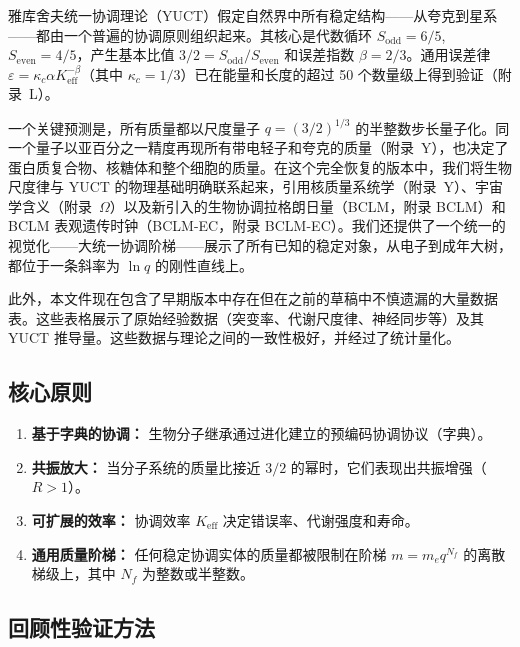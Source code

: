 \documentclass[11pt,a4paper]{article}
\begin{document}
	雅库舍夫统一协调理论（YUCT）假定自然界中所有稳定结构——从夸克到星系——都由一个普遍的协调原则组织起来。其核心是代数循环 \(S_{\mathrm{odd}} = 6/5\), \(S_{\mathrm{even}} = 4/5\)，产生基本比值 \(3/2 = S_{\mathrm{odd}}/S_{\mathrm{even}}\) 和误差指数 \(\beta = 2/3\)。通用误差律 \(\varepsilon = \kappa_c \alpha K_{\mathrm{eff}}^{-\beta}\)（其中 \(\kappa_c = 1/3\)）已在能量和长度的超过 50 个数量级上得到验证（附录~L）。
	
	一个关键预测是，所有质量都以尺度量子 \(q = (3/2)^{1/3}\) 的半整数步长量子化。同一个量子以亚百分之一精度再现所有带电轻子和夸克的质量（附录~Y），也决定了蛋白质复合物、核糖体和整个细胞的质量。在这个完全恢复的版本中，我们将生物尺度律与 YUCT 的物理基础明确联系起来，引用核质量系统学（附录~Y）、宇宙学含义（附录~\(\Omega\)）以及新引入的生物协调拉格朗日量（BCLM，附录 BCLM）和 BCLM 表观遗传时钟（BCLM-EC，附录 BCLM-EC）。我们还提供了一个统一的视觉化——大统一协调阶梯——展示了所有已知的稳定对象，从电子到成年大树，都位于一条斜率为 \(\ln q\) 的刚性直线上。
	
	此外，本文件现在包含了早期版本中存在但在之前的草稿中不慎遗漏的大量数据表。这些表格展示了原始经验数据（突变率、代谢尺度律、神经同步等）及其 YUCT 推导量。这些数据与理论之间的一致性极好，并经过了统计量化。
	
	\subsection{核心原则}
	
	\begin{enumerate}
		\item \textbf{基于字典的协调：} 生物分子继承通过进化建立的预编码协调协议（字典）。
		\item \textbf{共振放大：} 当分子系统的质量比接近 \(3/2\) 的幂时，它们表现出共振增强（\(R > 1\)）。
		\item \textbf{可扩展的效率：} 协调效率 \(K_{\mathrm{eff}}\) 决定错误率、代谢强度和寿命。
		\item \textbf{通用质量阶梯：} 任何稳定协调实体的质量都被限制在阶梯 \(m = m_e q^{N_f}\) 的离散梯级上，其中 \(N_f\) 为整数或半整数。
	\end{enumerate}
	
	\subsection{回顾性验证方法}
	
\end{document}
